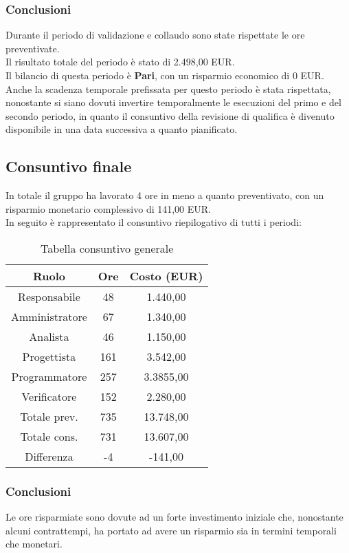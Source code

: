 \subsubsection{Conclusioni}
Durante il periodo di validazione e collaudo sono state rispettate le ore preventivate.\\
Il risultato totale del periodo è stato di 2.498,00 EUR.
\\Il bilancio di questa periodo è \textbf{Pari}, con un risparmio economico di 0 EUR. Anche la scadenza temporale prefissata per questo periodo è stata rispettata, nonostante si siano dovuti invertire temporalmente le esecuzioni del primo e del secondo periodo, in quanto il consuntivo della revisione di qualifica è divenuto disponibile in una data successiva a quanto pianificato.

\subsection{Consuntivo finale}
In totale il gruppo ha lavorato 4 ore in meno a quanto preventivato, con un risparmio monetario complessivo di 141,00 EUR. \\
In seguito è rappresentato il consuntivo riepilogativo di tutti i periodi:
\begin{table}[h]
	\caption{Tabella consuntivo generale}  
	\begin{center}
		\begin{tabular}{ |c|c|c|  }
			\hline
			Ruolo 			& Ore 	& Costo (EUR)\\
			\hline\hline
			Responsabile	& 48	& 1.440,00\\
			Amministratore	& 67	& 1.340,00\\
			Analista		& 46	& 1.150,00\\
			Progettista		& 161	& 3.542,00\\
			Programmatore	& 257	& 3.3855,00\\
			Verificatore	& 152	& 2.280,00\\
			\hline\hline
			Totale prev.	& 735	& 13.748,00 \\
			Totale cons.	& 731	& 13.607,00 \\
			Differenza		& -4	& -141,00 \\
			\hline
		\end{tabular}
	\end{center}
\end{table}

\newpage
\subsubsection{Conclusioni}
Le ore risparmiate sono dovute ad un forte investimento iniziale che, nonostante alcuni contrattempi, ha portato ad avere un risparmio sia in termini temporali che monetari.